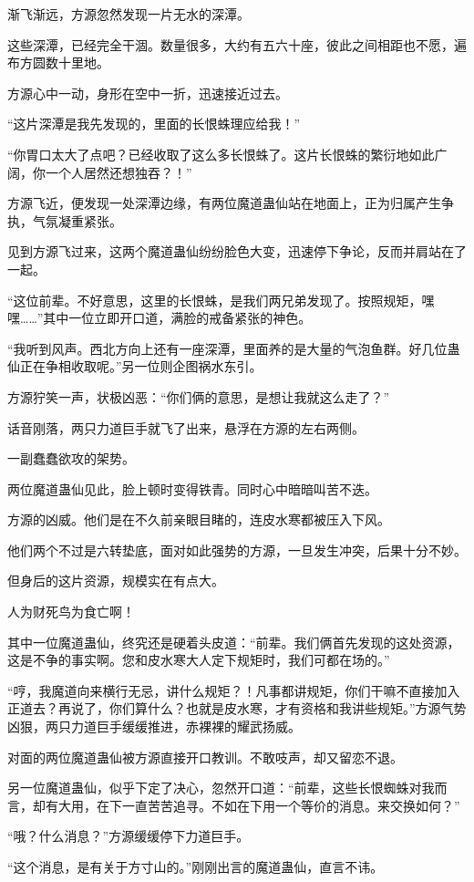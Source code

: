 \begin{this_body}
渐飞渐远，方源忽然发现一片无水的深潭。

这些深潭，已经完全干涸。数量很多，大约有五六十座，彼此之间相距也不愿，遍布方圆数十里地。

方源心中一动，身形在空中一折，迅速接近过去。

“这片深潭是我先发现的，里面的长恨蛛理应给我！”

“你胃口太大了点吧？已经收取了这么多长恨蛛了。这片长恨蛛的繁衍地如此广阔，你一个人居然还想独吞？！”

方源飞近，便发现一处深潭边缘，有两位魔道蛊仙站在地面上，正为归属产生争执，气氛凝重紧张。

见到方源飞过来，这两个魔道蛊仙纷纷脸色大变，迅速停下争论，反而并肩站在了一起。

“这位前辈。不好意思，这里的长恨蛛，是我们两兄弟发现了。按照规矩，嘿嘿……”其中一位立即开口道，满脸的戒备紧张的神色。

“我听到风声。西北方向上还有一座深潭，里面养的是大量的气泡鱼群。好几位蛊仙正在争相收取呢。”另一位则企图祸水东引。

方源狞笑一声，状极凶恶：“你们俩的意思，是想让我就这么走了？”

话音刚落，两只力道巨手就飞了出来，悬浮在方源的左右两侧。

一副蠢蠢欲攻的架势。

两位魔道蛊仙见此，脸上顿时变得铁青。同时心中暗暗叫苦不迭。

方源的凶威。他们是在不久前亲眼目睹的，连皮水寒都被压入下风。

他们两个不过是六转垫底，面对如此强势的方源，一旦发生冲突，后果十分不妙。

但身后的这片资源，规模实在有点大。

人为财死鸟为食亡啊！

其中一位魔道蛊仙，终究还是硬着头皮道：“前辈。我们俩首先发现的这处资源，这是不争的事实啊。您和皮水寒大人定下规矩时，我们可都在场的。”

“哼，我魔道向来横行无忌，讲什么规矩？！凡事都讲规矩，你们干嘛不直接加入正道去？再说了，你们算什么？也就是皮水寒，才有资格和我讲些规矩。”方源气势凶狠，两只力道巨手缓缓推进，赤裸裸的耀武扬威。

对面的两位魔道蛊仙被方源直接开口教训。不敢吱声，却又留恋不退。

另一位魔道蛊仙，似乎下定了决心，忽然开口道：“前辈，这些长恨蜘蛛对我而言，却有大用，在下一直苦苦追寻。不如在下用一个等价的消息。来交换如何？”

“哦？什么消息？”方源缓缓停下力道巨手。

“这个消息，是有关于方寸山的。”刚刚出言的魔道蛊仙，直言不讳。


\end{this_body}
